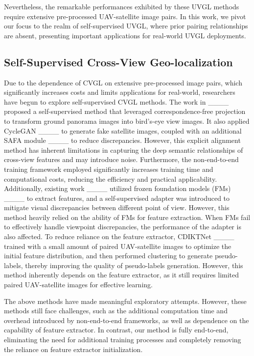 Nevertheless, the remarkable performances exhibited by these UVGL methods require extensive pre-processed UAV-satellite image pairs. In this work, we pivot our focus to the realm of self-supervised UVGL, where prior pairing relationships are absent, presenting important applications for real-world UVGL deployments.

\subsection{Self-Supervised Cross-View Geo-localization}
Due to the dependence of CVGL on extensive pre-processed image pairs, which significantly increases costs and limits applications for real-world, researchers have begun to explore self-supervised CVGL methods. The work in ____ proposed a self-supervised method that leveraged correspondence-free projection to transform ground panorama images into bird’s-eye view images. It also applied CycleGAN ____ to generate fake satellite images, coupled with an additional SAFA module ____ to reduce discrepancies. However, this explicit alignment method has inherent limitations in capturing the deep semantic relationships of cross-view features and may introduce noise. Furthermore, the non-end-to-end training framework employed significantly increases training time and computational costs, reducing the efficiency and practical applicability. Additionally, existing work ____ utilized frozen foundation models (FMs) ____ to extract features, and a self-supervised adapter was introduced to mitigate visual discrepancies between different point of view. However, this method heavily relied on the ability of FMs for feature extraction. When FMs fail to effectively handle viewpoint discrepancies, the performance of the adapter is also affected. To reduce reliance on the feature extractor, CDIKTNet ____ trained with a small amount of paired UAV-satellite images to optimize the initial feature distribution, and then performed clustering to generate pseudo-labels, thereby improving the quality of pseudo-labels generation. However, this method inherently depends on the feature extractor, as it still requires limited paired UAV-satellite images for effective learning. 

The above methods have made meaningful exploratory attempts. However, these methods still face challenges, such as the additional computation time and overhead introduced by non-end-to-end frameworks, as well as dependence on the capability of feature extractor. In contrast, our method is fully end-to-end, eliminating the need for additional training processes and completely removing the reliance on feature extractor initialization.

